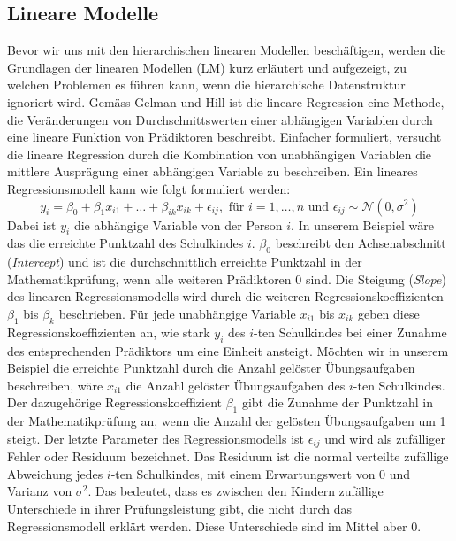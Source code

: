 \documentclass[12pt, a4paper]{article}\usepackage[]{graphicx}\usepackage[]{color}
\begin{document}
\subsection{Lineare Modelle} \label{section:linear_model}
Bevor wir uns mit den hierarchischen linearen Modellen beschäftigen, werden die Grundlagen der linearen Modellen (LM) kurz erläutert und aufgezeigt, zu welchen Problemen es führen kann, wenn die hierarchische Datenstruktur ignoriert wird. Gemäss Gelman und Hill \citeyearpar{andrew_data} ist die lineare Regression eine Methode, die Veränderungen von Durchschnittswerten einer abhängigen Variablen durch eine lineare Funktion von Prädiktoren beschreibt. Einfacher formuliert, versucht die lineare Regression durch die Kombination von unabhängigen Variablen die mittlere Ausprägung einer abhängigen Variable zu beschreiben. Ein lineares Regressionsmodell kann wie folgt formuliert werden:
\begin{equation} \label{eq:ols_model}
y_{i} = \beta_{0} + \beta_{1}x_{i1} + \dots + \beta_{ik}x_{ik} + \epsilon_{ij}, \text{ für } i = 1, \dots, n \text{ und } \epsilon_{ij} \sim \mathcal{N}(0,\sigma^{2})
\end{equation}
Dabei ist $y_{i}$ die abhängige Variable von der Person $i$. In unserem Beispiel wäre das die erreichte Punktzahl des Schulkindes $i$. $\beta_0$ beschreibt den Achsenabschnitt (\textit{Intercept}) und ist die durchschnittlich erreichte Punktzahl in der Mathematikprüfung, wenn alle weiteren Prädiktoren 0 sind. Die Steigung (\textit{Slope}) des linearen Regressionsmodells wird durch die weiteren Regressionskoeffizienten $\beta_{1}$ bis $\beta_{k}$ beschrieben. Für jede unabhängige Variable $x_{i1}$ bis $x_{ik}$ geben diese Regressionskoeffizienten an, wie stark $y_{i}$ des $i$-ten Schulkindes bei einer Zunahme des entsprechenden Prädiktors um eine Einheit ansteigt. Möchten wir in unserem Beispiel die erreichte Punktzahl durch die Anzahl gelöster Übungsaufgaben beschreiben, wäre $x_{i1}$ die Anzahl gelöster Übungsaufgaben des $i$-ten Schulkindes. Der dazugehörige Regressionskoeffizient $\beta_{1}$ gibt die Zunahme der Punktzahl in der Mathematikprüfung an, wenn die Anzahl der gelösten Übungsaufgaben um 1 steigt. Der letzte Parameter des Regressionsmodells ist $\epsilon_{ij}$ und wird als zufälliger Fehler oder Residuum bezeichnet. Das Residuum ist die normal verteilte zufällige Abweichung jedes $i$-ten Schulkindes, mit einem Erwartungswert von 0 und Varianz von $\sigma^{2}$. Das bedeutet, dass es zwischen den Kindern zufällige Unterschiede in ihrer Prüfungsleistung gibt, die nicht durch das Regressionsmodell erklärt werden. Diese Unterschiede sind im Mittel aber 0. 
\end{document}
